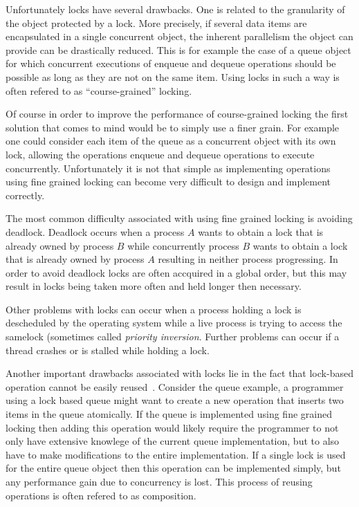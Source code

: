 Unfortunately locks have several drawbacks. One is related to the  granularity
of the object protected by a lock. More precisely, if several data items 
are encapsulated  in a single  concurrent  object, the
inherent parallelism  the object can provide 
can be drastically reduced. This  is for example the case of a queue 
object for which concurrent executions of enqueue and dequeue operations 
should be possible as long as they are not on the same item.
Using locks in such a way is often refered to as ``course-grained'' locking.

Of course in order to improve the performance of course-grained locking
the first solution that comes to mind would be to simply
use a finer grain.  For example one could consider
each item of the queue as  a concurrent object with its own lock,
allowing the  operations  enqueue  
and  dequeue  operations to execute concurrently.
Unfortunately it is not that simple as implementing operations using
fine grained locking can  become very   difficult  to  design and implement
correctly.

The most common difficulty associated with using fine grained locking
is avoiding deadlock.
Deadlock occurs when a process $A$ wants to obtain a lock that
is already owned by process $B$ while concurrently process $B$ wants
to obtain a lock that is already owned by process $A$ resulting
in neither process progressing.
In order to avoid deadlock locks are often accquired in a global order,
but this may result in locks being taken more often and held longer then necessary.

Other problems with locks can occur when a process holding a lock
is descheduled by the operating system while a live process is trying to
access the samelock (sometimes called \emph{priority inversion}.
Further problems can occur if a thread crashes or is stalled while
holding a lock.

Another important drawbacks associated with locks lie in the fact that 
lock-based operation cannot be easily reused~\cite{HMPH05,GG11}.
Consider the queue example, a programmer using a lock based queue
might want to create a new operation that inserts two items in the queue
atomically.
If the queue is implemented using fine grained locking then adding this operation
would likely require the programmer to not only have extensive knowlege of the current
queue implementation, but to also have to make modifications to the entire implementation.
If a single lock is used for the entire queue object then this operation can be implemented
simply, but any performance gain due to concurrency is lost.
This process of reusing operations is often refered to as composition.




